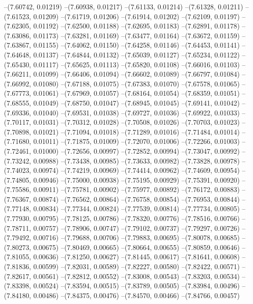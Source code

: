--(7.60742, 0.01219)
--(7.60938, 0.01217)
--(7.61133, 0.01214)
--(7.61328, 0.01211)
--(7.61523, 0.01209)
--(7.61719, 0.01206)
--(7.61914, 0.01202)
--(7.62109, 0.01197)
--(7.62305, 0.01192)
--(7.62500, 0.01188)
--(7.62695, 0.01183)
--(7.62891, 0.01178)
--(7.63086, 0.01173)
--(7.63281, 0.01169)
--(7.63477, 0.01164)
--(7.63672, 0.01159)
--(7.63867, 0.01155)
--(7.64062, 0.01150)
--(7.64258, 0.01146)
--(7.64453, 0.01141)
--(7.64648, 0.01137)
--(7.64844, 0.01132)
--(7.65039, 0.01127)
--(7.65234, 0.01122)
--(7.65430, 0.01117)
--(7.65625, 0.01113)
--(7.65820, 0.01108)
--(7.66016, 0.01103)
--(7.66211, 0.01099)
--(7.66406, 0.01094)
--(7.66602, 0.01089)
--(7.66797, 0.01084)
--(7.66992, 0.01080)
--(7.67188, 0.01075)
--(7.67383, 0.01070)
--(7.67578, 0.01065)
--(7.67773, 0.01061)
--(7.67969, 0.01057)
--(7.68164, 0.01054)
--(7.68359, 0.01051)
--(7.68555, 0.01049)
--(7.68750, 0.01047)
--(7.68945, 0.01045)
--(7.69141, 0.01042)
--(7.69336, 0.01040)
--(7.69531, 0.01038)
--(7.69727, 0.01036)
--(7.69922, 0.01033)
--(7.70117, 0.01031)
--(7.70312, 0.01028)
--(7.70508, 0.01026)
--(7.70703, 0.01023)
--(7.70898, 0.01021)
--(7.71094, 0.01018)
--(7.71289, 0.01016)
--(7.71484, 0.01014)
--(7.71680, 0.01011)
--(7.71875, 0.01009)
--(7.72070, 0.01006)
--(7.72266, 0.01003)
--(7.72461, 0.01000)
--(7.72656, 0.00997)
--(7.72852, 0.00994)
--(7.73047, 0.00992)
--(7.73242, 0.00988)
--(7.73438, 0.00985)
--(7.73633, 0.00982)
--(7.73828, 0.00978)
--(7.74023, 0.00974)
--(7.74219, 0.00969)
--(7.74414, 0.00962)
--(7.74609, 0.00954)
--(7.74805, 0.00946)
--(7.75000, 0.00938)
--(7.75195, 0.00929)
--(7.75391, 0.00920)
--(7.75586, 0.00911)
--(7.75781, 0.00902)
--(7.75977, 0.00892)
--(7.76172, 0.00883)
--(7.76367, 0.00874)
--(7.76562, 0.00864)
--(7.76758, 0.00854)
--(7.76953, 0.00844)
--(7.77148, 0.00834)
--(7.77344, 0.00824)
--(7.77539, 0.00814)
--(7.77734, 0.00805)
--(7.77930, 0.00795)
--(7.78125, 0.00786)
--(7.78320, 0.00776)
--(7.78516, 0.00766)
--(7.78711, 0.00757)
--(7.78906, 0.00747)
--(7.79102, 0.00737)
--(7.79297, 0.00726)
--(7.79492, 0.00716)
--(7.79688, 0.00706)
--(7.79883, 0.00695)
--(7.80078, 0.00685)
--(7.80273, 0.00675)
--(7.80469, 0.00665)
--(7.80664, 0.00655)
--(7.80859, 0.00646)
--(7.81055, 0.00636)
--(7.81250, 0.00627)
--(7.81445, 0.00617)
--(7.81641, 0.00608)
--(7.81836, 0.00599)
--(7.82031, 0.00589)
--(7.82227, 0.00580)
--(7.82422, 0.00571)
--(7.82617, 0.00561)
--(7.82812, 0.00552)
--(7.83008, 0.00543)
--(7.83203, 0.00534)
--(7.83398, 0.00524)
--(7.83594, 0.00515)
--(7.83789, 0.00505)
--(7.83984, 0.00496)
--(7.84180, 0.00486)
--(7.84375, 0.00476)
--(7.84570, 0.00466)
--(7.84766, 0.00457)
